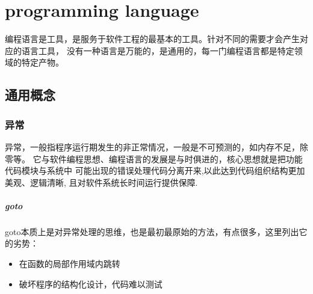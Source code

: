 \clearpage

\part{programming language}
编程语言是工具，是服务于软件工程的最基本的工具。针对不同的需要才会产生对应的语言工具，
没有一种语言是万能的，是通用的，每一门编程语言都是特定领域的特定产物。

\chapter{通用概念}

\section{异常}
异常，一般指程序运行期发生的非正常情况，一般是不可预测的，如内存不足，除零等。
它与软件编程思想、编程语言的发展是与时俱进的，核心思想就是把功能代码模块与系统中
可能出现的错误处理代码分离开来,以此达到代码组织结构更加美观、逻辑清晰,
且对软件系统长时间运行提供保障.

\subsubsection{goto}
goto本质上是对异常处理的思维，也是最初最原始的方法，有点很多，这里列出它的劣势：
\begin{itemize}
    \item {在函数的局部作用域内跳转}
    \item {破坏程序的结构化设计，代码难以测试}
\end{itemize}

